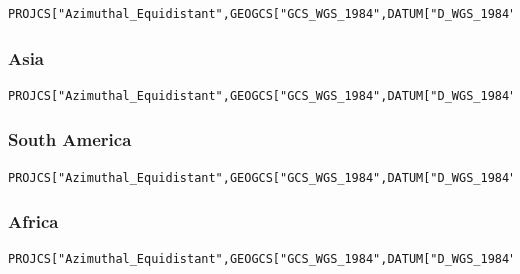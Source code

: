 \documentclass[11pt,a4paper]{article}
\begin{document}
\begin{lstlisting}
PROJCS["Azimuthal_Equidistant",GEOGCS["GCS_WGS_1984",DATUM["D_WGS_1984",SPHEROID["WGS_1984",6378137.0,298.257223563]],PRIMEM["Greenwich",0.0],UNIT["Degree",0.0174532925199433]],PROJECTION["Azimuthal_Equidistant"],PARAMETER["false_easting",5837287.81977],PARAMETER["false_northing",2121415.69617],PARAMETER["central_meridian",24.0],PARAMETER["latitude_of_origin",53.0],UNIT["Meter",1.0]]
\end{lstlisting}

\subsubsection*{Asia}

\begin{lstlisting}
PROJCS["Azimuthal_Equidistant",GEOGCS["GCS_WGS_1984",DATUM["D_WGS_1984",SPHEROID["WGS_1984",6378137.0,298.257223563]],PRIMEM["Greenwich",0.0],UNIT["Degree",0.0174532925199433]],PROJECTION["Azimuthal_Equidistant"],PARAMETER["false_easting",4340913.84808],PARAMETER["false_northing",4812712.92347],PARAMETER["central_meridian",94.0],PARAMETER["latitude_of_origin",47.0],UNIT["Meter",1.0]]
\end{lstlisting}

\subsubsection*{South America}

\begin{lstlisting}
PROJCS["Azimuthal_Equidistant",GEOGCS["GCS_WGS_1984",DATUM["D_WGS_1984",SPHEROID["WGS_1984",6378137.0,298.257223563]],PRIMEM["Greenwich",0.0],UNIT["Degree",0.0174532925199433]],PROJECTION["Azimuthal_Equidistant"],PARAMETER["false_easting",7257179.23559],PARAMETER["false_northing",5592024.44605],PARAMETER["central_meridian",-60.5],PARAMETER["latitude_of_origin",-14.0],UNIT["Meter",1.0]]
\end{lstlisting}

\newpage

\subsubsection*{Africa}

\begin{lstlisting}
PROJCS["Azimuthal_Equidistant",GEOGCS["GCS_WGS_1984",DATUM["D_WGS_1984",SPHEROID["WGS_1984",6378137.0,298.257223563]],PRIMEM["Greenwich",0.0],UNIT["Degree",0.0174532925199433]],PROJECTION["Azimuthal_Equidistant"],PARAMETER["false_easting",5621452.01998],PARAMETER["false_northing",5990638.42298],PARAMETER["central_meridian",21.5],PARAMETER["latitude_of_origin",8.5],UNIT["Meter",1.0]]
\end{lstlisting}
\end{document}

